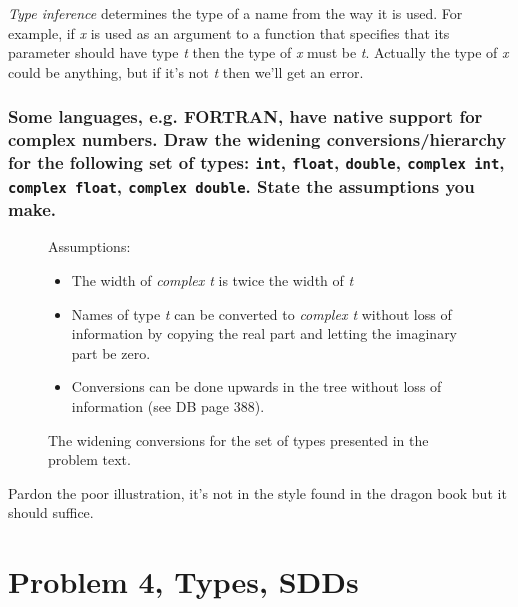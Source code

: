\emph{Type inference} determines the type of a name from the way it is used.
For example, if \emph{x} is used as an argument to a function that specifies that its parameter should have type \emph{t} then the type of \emph{x} must be \emph{t}.
Actually the type of \emph{x} could be anything, but if it's not \emph{t} then we'll get an error.

\subsubsection{Some languages, e.g. FORTRAN, have native support for complex numbers. Draw the widening conversions/hierarchy for the following set of types: \texttt{int}, \texttt{float}, \texttt{double}, \texttt{complex int}, \texttt{complex float}, \texttt{complex double}. State the assumptions you make.}
\begin{figure}[H]
Assumptions: 
\begin{itemize}
	\item The width of \emph{complex t} is twice the width of \emph{t} 
	\item Names of type \emph{t} can be converted to \emph{complex t} without loss of information by copying the real part and letting the imaginary part be zero.
	\item Conversions can be done upwards in the tree without loss of information (see \textsc{DB} page 388).
\end{itemize}
\end{figure}

\begin{figure}[H]
\centering

\caption{The widening conversions for the set of types presented in the problem text.}
\label{fig:3-b}
\end{figure}
Pardon the poor illustration, it's not in the style found in the dragon book but it should suffice.

\newpage
\setcounter{subsubsection}{0}
\section{Problem 4, Types, SDDs}

